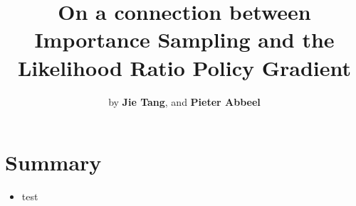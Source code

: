 \documentclass[graybox]{svmult}
\begin{document}
\title*{On a connection between Importance Sampling and the Likelihood Ratio Policy Gradient}
\author{by \textbf{Jie Tang}, and \textbf{Pieter Abbeel}}


%
%
\maketitle


\section{Summary}

\begin{itemize}
\item test
\end{itemize}
\end{document}
